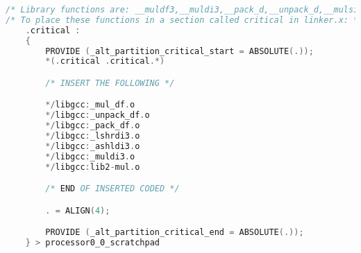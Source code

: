 % 
% 
% 
% 
% 
% 
% 
% 
% 
%  
% 
% 
% 
\begin{lstlisting}[caption={Placing library functions in \texttt{.critical} region},label=l:jlib,language=C]
/* Library functions are: __muldf3,__muldi3,__pack_d,__unpack_d,__mulsi3,__lshrdi3,__ashldi3 */
/* To place these functions in a section called critical in linker.x: */
    .critical :
    {
        PROVIDE (_alt_partition_critical_start = ABSOLUTE(.));
        *(.critical .critical.*)

        /* INSERT THE FOLLOWING */

        */libgcc:_mul_df.o
        */libgcc:_unpack_df.o
        */libgcc:_pack_df.o
        */libgcc:_lshrdi3.o
        */libgcc:_ashldi3.o
        */libgcc:_muldi3.o
        */libgcc:lib2-mul.o

        /* END OF INSERTED CODED */

        . = ALIGN(4);

        PROVIDE (_alt_partition_critical_end = ABSOLUTE(.));
    } > processor0_0_scratchpad


\end{lstlisting}



